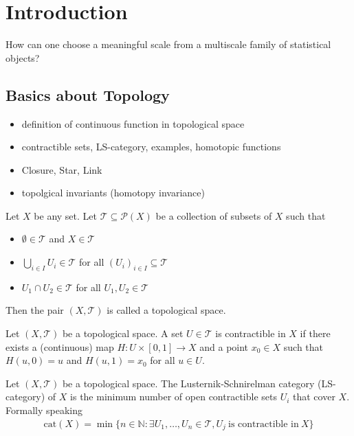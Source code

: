 \chapter{Introduction}

How can one choose a meaningful scale from a multiscale family of statistical objects?

\section{Basics about Topology}

\begin{itemize}
    \item definition of continuous function in topological space 
    \item contractible sets, LS-category, examples, homotopic functions
    \item Closure, Star, Link
    \item topolgical invariants (homotopy invariance)
\end{itemize}

\begin{Def}
    Let $X$ be any set. Let $\mathcal{T}\subseteq\mathcal{P}(X)$ be a collection of subsets of $X$ such that
    \begin{itemize}
        \item $\emptyset\in\mathcal{T}$ and $X\in\mathcal{T}$
        \item $\bigcup_{i\in I}U_i\in\mathcal{T}$ for all $(U_i)_{i\in I}\subseteq\mathcal{T}$
        \item $U_1\cap U_2\in\mathcal{T}$ for all $U_1,U_2\in\mathcal{T}$
    \end{itemize}
    Then the pair $(X,\mathcal{T})$ is called a topological space.
\end{Def}

\begin{Def}
    Let $(X,\mathcal{T})$ be a topological space. A set $U\in\mathcal{T}$ is contractible in $X$ if there exists a (continuous) map $H:U\times[0,1]\to X$ and a point $x_0\in X$ such that $H(u,0)=u$ and $H(u,1)=x_0$ for all $u\in U$.
\end{Def}

\begin{Def}
    Let $(X,\mathcal{T})$ be a topological space. The Lusternik-Schnirelman category (LS-category) of $X$ is the minimum number of open contractible sets $U_i$ that cover $X$. Formally speaking
    \begin{align*}
        \text{cat}(X)=\min\{n\in\mathbb{N}:\exists U_1,\dots,U_n\in\mathcal{T},U_j\ \text{is contractible in}\ X\}
    \end{align*}
\end{Def}

